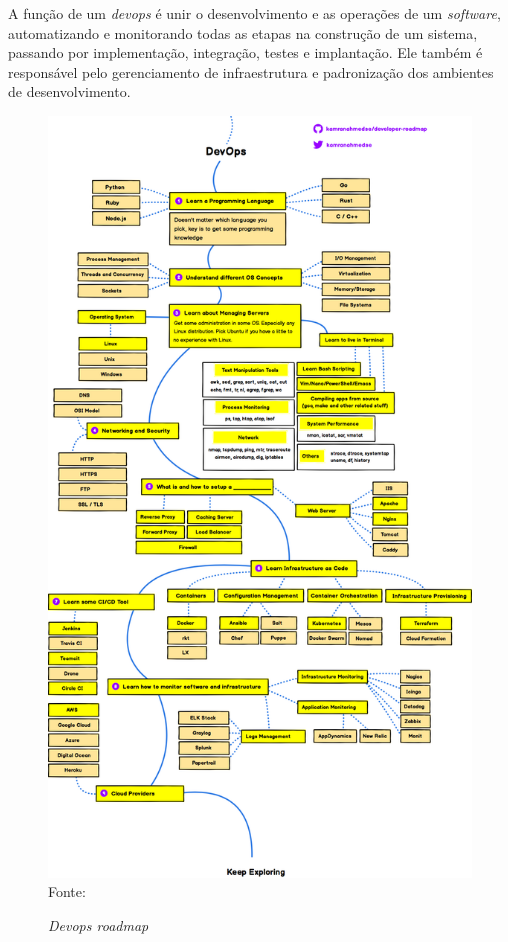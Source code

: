 \documentclass[
	12pt,				%
	openright,			%
	twoside,			%
	a4paper,			%
	english,			%
	brazil				%
	]{abntex2}
\begin{document}
A função de um \textit{devops} é unir o desenvolvimento e as operações de um \textit{software}, automatizando e monitorando todas as etapas na construção de um sistema, passando por implementação, integração, testes e implantação. Ele também é responsável pelo gerenciamento de infraestrutura e padronização dos ambientes de desenvolvimento.

\begin{figure}[h!]
	\centering

	\caption{\textit{Devops roadmap}} \label{fig:DevopsRoadmap}
    \includegraphics[scale=0.29]{devops-roadmap} \\
    Fonte: {\cite{ahmedse_roadmap}}

\end{figure}
\end{document}
